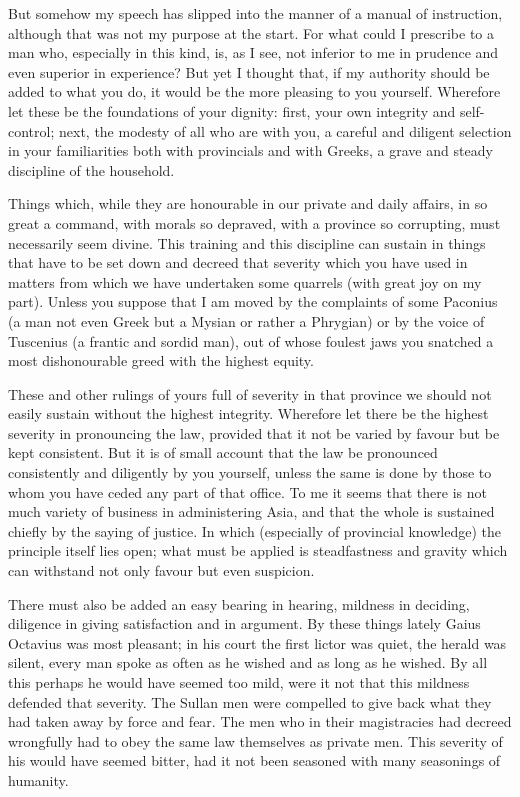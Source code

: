 But somehow my speech has slipped into the manner of a manual of instruction, although that was not my purpose at the start. For what could I prescribe to a man who, especially in this kind, is, as I see, not inferior to me in prudence and even superior in experience? But yet I thought that, if my authority should be added to what you do, it would be the more pleasing to you yourself. Wherefore let these be the foundations of your dignity: first, your own integrity and self-control; next, the modesty of all who are with you, a careful and diligent selection in your familiarities both with provincials and with Greeks, a grave and steady discipline of the household.

 Things which, while they are honourable in our private and daily affairs, in so great a command, with morals so depraved, with a province so corrupting, must necessarily seem divine. This training and this discipline can sustain in things that have to be set down and decreed that severity which you have used in matters from which we have undertaken some quarrels (with great joy on my part). Unless you suppose that I am moved by the complaints of some Paconius (a man not even Greek but a Mysian or rather a Phrygian) or by the voice of Tuscenius (a frantic and sordid man), out of whose foulest jaws you snatched a most dishonourable greed with the highest equity.

 These and other rulings of yours full of severity in that province we should not easily sustain without the highest integrity. Wherefore let there be the highest severity in pronouncing the law, provided that it not be varied by favour but be kept consistent. But it is of small account that the law be pronounced consistently and diligently by you yourself, unless the same is done by those to whom you have ceded any part of that office. To me it seems that there is not much variety of business in administering Asia, and that the whole is sustained chiefly by the saying of justice. In which (especially of provincial knowledge) the principle itself lies open; what must be applied is steadfastness and gravity which can withstand not only favour but even suspicion.

 There must also be added an easy bearing in hearing, mildness in deciding, diligence in giving satisfaction and in argument. By these things lately Gaius Octavius was most pleasant; in his court the first lictor was quiet, the herald was silent, every man spoke as often as he wished and as long as he wished. By all this perhaps he would have seemed too mild, were it not that this mildness defended that severity. The Sullan men were compelled to give back what they had taken away by force and fear. The men who in their magistracies had decreed wrongfully had to obey the same law themselves as private men. This severity of his would have seemed bitter, had it not been seasoned with many seasonings of humanity.


